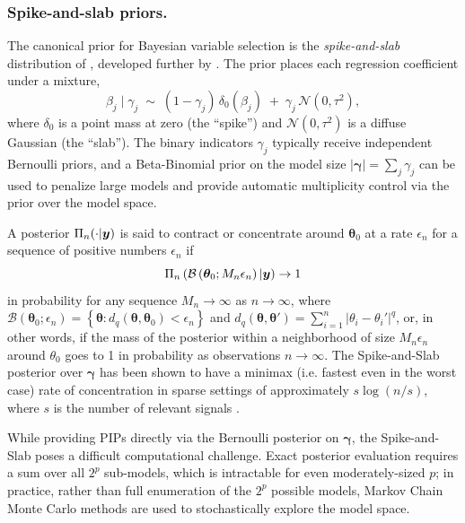 \subsubsection*{Spike-and-slab priors.}
The canonical prior for Bayesian variable selection is the
\emph{spike-and-slab} distribution of \citet{mitchell_bayesian_1988},
developed further by \citet{george_approaches_1997}. The prior
places each regression coefficient under a mixture,
\begin{equation}
  \beta_j \mid \gamma_j
  \;\sim\;
  (1 - \gamma_j)\,\delta_0(\beta_j)
  \;+\;
  \gamma_j\,\mathcal{N}(0, \tau^2),
  \label{eq:spike-slab}
\end{equation}
where $\delta_0$ is a point mass at zero (the ``spike'') and
$\mathcal{N}(0, \tau^2)$ is a diffuse Gaussian (the ``slab'').
The binary indicators $\gamma_j$ typically receive independent
Bernoulli priors, and a Beta-Binomial prior on the model size
$|\boldsymbol{\gamma}| = \sum_j \gamma_j$ can be used to
penalize large models and provide automatic multiplicity control
\citep{bernardo_fdr_2007} via the prior over the model space.  

A posterior $\Pi_n(\cdot | \bm{y})$ is said to contract or concentrate around $\bm\theta_0$ at a rate $\epsilon_n$ for a sequence of positive numbers $\epsilon_n$ if
\begin{equation}
    \Pi_n\left(\mathcal{B}\left(\bm\theta_0 ; M_n \epsilon_n \right) | \bm{y} \right) \rightarrow 1
\end{equation}
in probability for any sequence $M_n \rightarrow \infty$ as $n \rightarrow \infty$, where $\mathcal{B}\left(\bm\theta_0 ; \epsilon_n \right) = \left\{ \bm{\theta}: d_q(\bm\theta, \bm\theta_0) < \epsilon_n \right\}$ and $d_q (\bm\theta, \bm\theta') = \sum_{i=1}^n |\theta_i - \theta_i'|^q$, or, in other words, if the mass of the posterior within a neighborhood of size $M_n\epsilon_n$ around $\theta_0$ goes to 1 in probability as observations $n \rightarrow \infty$. The Spike-and-Slab posterior over
$\boldsymbol{\gamma}$ has been shown to have a minimax (i.e. fastest even in the worst case) rate of concentration in sparse settings of approximately $s \log(n/s)$, where $s$ is the number of relevant signals \citep{abramovich_optimality_2007, castillo_needles_2012}.

While providing PIPs directly via the Bernoulli posterior on $\bm \gamma$, 
the Spike-and-Slab poses a difficult computational
challenge.  Exact posterior evaluation requires a sum over
all $2^p$ sub-models, which is intractable for even moderately-sized $p$;
in practice, rather than full enumeration of the $2^p$ possible models, 
Markov Chain Monte Carlo methods are used to stochastically explore the model space.


